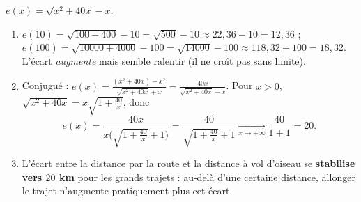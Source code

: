 \documentclass[11pt,a4paper]{article}
\begin{document}
\begin{correction}
$e(x)=\sqrt{x^2+40x}-x$.
\begin{enumerate}[label=\alph*),leftmargin=2em,itemsep=3pt]
  \item $e(10)=\sqrt{100+400}-10=\sqrt{500}-10\approx 22{,}36-10=12{,}36$ ;\\
        $e(100)=\sqrt{10000+4000}-100=\sqrt{14000}-100\approx 118{,}32-100=18{,}32$.
        L'écart \emph{augmente} mais semble ralentir (il ne croît pas sans limite).
  \item Conjugué : $\displaystyle e(x)=\frac{(x^2+40x)-x^2}{\sqrt{x^2+40x}+x}=\frac{40x}{\sqrt{x^2+40x}+x}$.
        Pour $x>0$, $\sqrt{x^2+40x}=x\sqrt{1+\frac{40}{x}}$, donc
        \[ e(x)=\frac{40x}{x\bigl(\sqrt{1+\frac{40}{x}}+1\bigr)}=\frac{40}{\sqrt{1+\frac{40}{x}}+1}
        \xrightarrow[x\to+\infty]{}\frac{40}{1+1}=20. \]
  \item L'écart entre la distance par la route et la distance à vol d'oiseau se \textbf{stabilise vers
        $20$ km} pour les grands trajets : au-delà d'une certaine distance, allonger le trajet n'augmente
        pratiquement plus cet écart.
\end{enumerate}
\end{correction}
\end{document}
